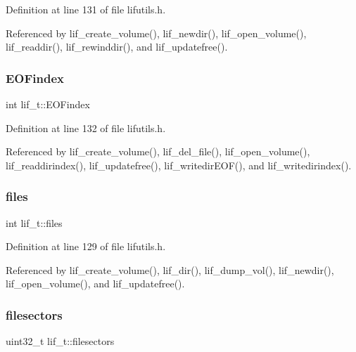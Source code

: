 Definition at line 131 of file lifutils.\+h.



Referenced by lif\+\_\+create\+\_\+volume(), lif\+\_\+newdir(), lif\+\_\+open\+\_\+volume(), lif\+\_\+readdir(), lif\+\_\+rewinddir(), and lif\+\_\+updatefree().

\mbox{\label{structlif__t_a68c465a879c7d4bd2279682185b6250e}} 
\subsubsection{\texorpdfstring{E\+O\+Findex}{EOFindex}}
{\footnotesize\ttfamily int lif\+\_\+t\+::\+E\+O\+Findex}



Definition at line 132 of file lifutils.\+h.



Referenced by lif\+\_\+create\+\_\+volume(), lif\+\_\+del\+\_\+file(), lif\+\_\+open\+\_\+volume(), lif\+\_\+readdirindex(), lif\+\_\+updatefree(), lif\+\_\+writedir\+E\+O\+F(), and lif\+\_\+writedirindex().

\mbox{\label{structlif__t_aceca398e2e3f6bcffe1593969544d546}} 
\subsubsection{\texorpdfstring{files}{files}}
{\footnotesize\ttfamily int lif\+\_\+t\+::files}



Definition at line 129 of file lifutils.\+h.



Referenced by lif\+\_\+create\+\_\+volume(), lif\+\_\+dir(), lif\+\_\+dump\+\_\+vol(), lif\+\_\+newdir(), lif\+\_\+open\+\_\+volume(), and lif\+\_\+updatefree().

\mbox{\label{structlif__t_a1223702cce63f879654d51773243643d}} 
\subsubsection{\texorpdfstring{filesectors}{filesectors}}
{\footnotesize\ttfamily uint32\+\_\+t lif\+\_\+t\+::filesectors}



